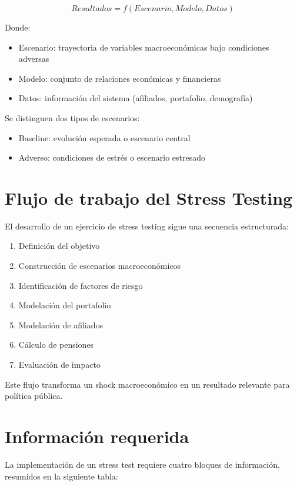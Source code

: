 \documentclass[11pt]{article}
\begin{document}
\begin{equation}
Resultados = f(Escenario, Modelo, Datos)
\end{equation}

Donde:

\begin{itemize}
\item Escenario: trayectoria de variables macroeconómicas bajo condiciones adversas
\item Modelo: conjunto de relaciones económicas y financieras
\item Datos: información del sistema (afiliados, portafolio, demografía)
\end{itemize}

Se distinguen dos tipos de escenarios:

\begin{itemize}
\item Baseline: evolución esperada o escenario central
\item Adverso: condiciones de estrés o escenario estresado
\end{itemize}

\section{Flujo de trabajo del Stress Testing}

El desarrollo de un ejercicio de stress testing sigue una secuencia estructurada:

\begin{enumerate}
\item Definición del objetivo
\item Construcción de escenarios macroeconómicos
\item Identificación de factores de riesgo
\item Modelación del portafolio
\item Modelación de afiliados
\item Cálculo de pensiones
\item Evaluación de impacto
\end{enumerate}

Este flujo transforma un shock macroeconómico en un resultado relevante para política pública.

\section{Información requerida}

La implementación de un stress test requiere cuatro bloques de información, resumidos en la siguiente tabla:
\end{document}
